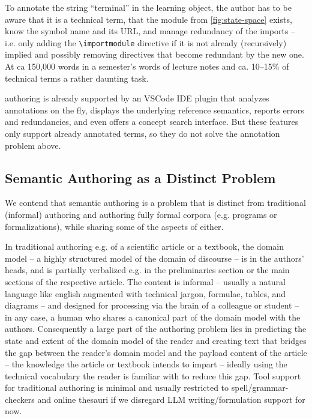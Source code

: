 \documentclass{llncs}
\begin{document}
To annotate the string ``terminal'' in the learning object, the author has to be aware
that it is a technical term, that the module from \cref{fig:state-space} exists, know the
symbol name and its URL, and manage redundancy of the imports -- i.e. only
adding the \lstinline|\importmodule| directive if it is not already (recursively) implied
and possibly removing directives that become redundant by the new one.  At ca 150,000
words in a semester's words of lecture notes and ca. 10--15\% of technical terms a rather daunting task.

\sTeX authoring is already supported by an VSCode IDE plugin \cite{sTeX-IDE:git} that
analyzes annotations on the fly, displays the underlying reference semantics, reports
errors and redundancies, and even offers a concept search interface.
But these features only support already annotated terms, so they do not solve the annotation problem above.

\subsection{Semantic Authoring as a Distinct Problem}

We contend that semantic authoring is a problem that is distinct from traditional
(informal) authoring and authoring fully formal corpora (e.g. programs or formalizations),
while sharing some of the aspects of either.

In traditional authoring e.g. of a scientific article or a textbook, the domain model -- a
highly structured model of the domain of discourse -- is in the authors' heads, and is
partially verbalized e.g. in the preliminaries section or the main sections of the
respective article. The content is informal -- usually a natural language like english
augmented with technical jargon, formulae, tables, and diagrams -- and designed for
processing via the brain of a colleague or student -- in any case, a human who shares a
canonical part of the domain model with the authors. Consequently a large part of the authoring problem lies in
predicting the state and extent of the domain model of the reader and creating text that
bridges the gap between the reader's domain model and the payload content of the article
-- the knowledge the article or textbook intends to impart -- ideally using the technical
vocabulary the reader is familiar with to reduce this gap. Tool support for traditional
authoring is minimal and usually restricted to spell/grammar-checkers and online thesauri
if we disregard LLM writing/formulation support for now.
\end{document}
